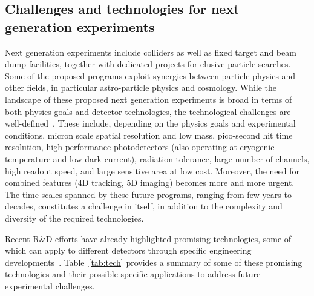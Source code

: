 \subsection{Challenges and technologies for next generation experiments}
\label{sec:detector:challenges_technologies}
Next generation experiments include colliders as well as fixed target and beam dump facilities, together with dedicated projects for elusive particle searches. Some of the proposed programs exploit synergies between particle physics and other fields, in particular astro-particle physics and cosmology.  While the landscape of these proposed next generation experiments is broad in terms of both physics goals and detector technologies, the technological challenges are well-defined~\cite{bib:LS-talk}. These include, depending on the physics goals and experimental conditions, micron scale spatial resolution and low mass, pico-second hit time resolution, high-performance photodetectors (also operating at cryogenic temperature and low dark current), radiation tolerance, large number of channels, high readout speed, and large sensitive area at low cost. 
Moreover, the need for combined features (4D tracking, 5D imaging) becomes more and more urgent.  The time scales spanned by these future programs, ranging from few years to decades, constitutes a challenge in itself, in addition to the complexity and diversity of the required technologies.

Recent R\&D efforts have already highlighted promising technologies, some of which can apply to different detectors through specific engineering developments~\cite{bib:FS-talk}. Table~\ref{tab:tech} provides a summary of some of these promising technologies and their possible specific applications to address future experimental challenges.



